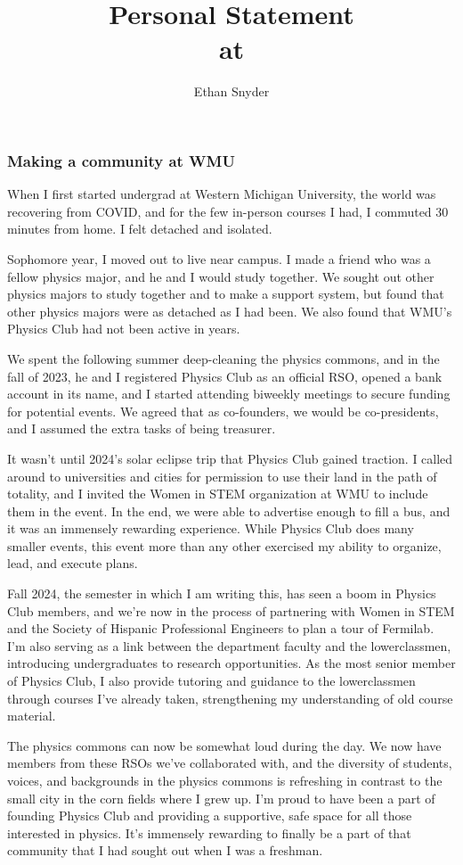 \documentclass[11pt]{article}
\title{Personal Statement\\
	\large \dept{} at \school{}}
\author{Ethan Snyder}
\date{}
\begin{document}
\maketitle
\subsubsection*{Making a community at WMU}
When I first started undergrad at Western Michigan University, the world was recovering from COVID, and for the few in-person courses I had, I commuted 30 minutes from home. I felt detached and isolated.

Sophomore year, I moved out to live near campus. I made a friend who was a fellow physics major, and he and I would study together. We sought out other physics majors to study together and to make a support system, but found that other physics majors were as detached as I had been. We also found that WMU's Physics Club had not been active in years.

We spent the following summer deep-cleaning the physics commons, and in the fall of 2023, he and I registered Physics Club as an official RSO, opened a bank account in its name, and I started attending biweekly meetings to secure funding for potential events. We agreed that as co-founders, we would be co-presidents, and I assumed the extra tasks of being treasurer.

It wasn't until 2024's solar eclipse trip that Physics Club gained traction. I called around to universities and cities for permission to use their land in the path of totality, and I invited the Women in STEM organization at WMU to include them in the event. In the end, we were able to advertise enough to fill a bus, and it was an immensely rewarding experience. While Physics Club does many smaller events, this event more than any other exercised my ability to organize, lead, and execute plans.

Fall 2024, the semester in which I am writing this, has seen a boom in Physics Club members, and we're now in the process of partnering with Women in STEM and the Society of Hispanic Professional Engineers to plan a tour of Fermilab. I'm also serving as a link between the department faculty and the lowerclassmen, introducing undergraduates to research opportunities. As the most senior member of Physics Club, I also provide tutoring and guidance to the lowerclassmen through courses I've already taken, strengthening my understanding of old course material.

The physics commons can now be somewhat loud during the day. We now have members from these RSOs we've collaborated with, and the diversity of students, voices, and backgrounds in the physics commons is refreshing in contrast to the small city in the corn fields where I grew up. I'm proud to have been a part of founding Physics Club and providing a supportive, safe space for all those interested in physics. It's immensely rewarding to finally be a part of that community that I had sought out when I was a freshman.
\end{document}

